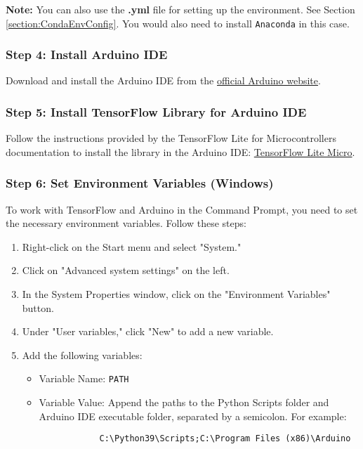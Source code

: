 \textbf{Note:} You can also use the \textbf{.yml} file for setting up the environment. See Section \ref{section:CondaEnvConfig}. You would also need to install \texttt{Anaconda} in this case.


\subsubsection{Step 4: Install Arduino IDE}

Download and install the Arduino IDE from the \href{https://www.arduino.cc/en/software}{official Arduino website}.

\subsubsection{Step 5: Install TensorFlow Library for Arduino IDE}

Follow the instructions provided by the TensorFlow Lite for Microcontrollers documentation to install the library in the Arduino IDE: \href{https://github.com/tensorflow/tflite-micro-arduino-examples}{TensorFlow Lite Micro}.

\subsubsection{Step 6: Set Environment Variables (Windows)}

To work with TensorFlow and Arduino in the Command Prompt, you need to set the necessary environment variables. Follow these steps:

\begin{enumerate}
	\item Right-click on the Start menu and select "System."
	\item Click on "Advanced system settings" on the left.
	\item In the System Properties window, click on the "Environment Variables" button.
	\item Under "User variables," click "New" to add a new variable.
	\item Add the following variables:
	
	\begin{itemize}
		\item Variable Name: \texttt{PATH}
		\item Variable Value: Append the paths to the Python Scripts folder and Arduino IDE executable folder, separated by a semicolon. For example:
		\begin{verbatim}
			C:\Python39\Scripts;C:\Program Files (x86)\Arduino
		\end{verbatim}
	\end{itemize}
\end{enumerate}


